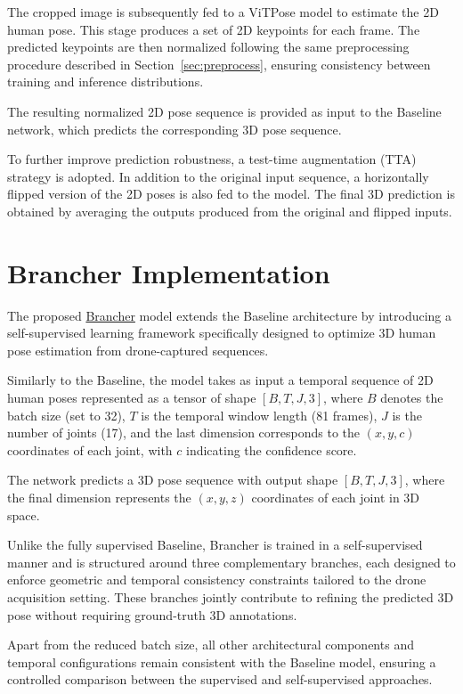 The cropped image is subsequently fed to a ViTPose \cite{xu2022vitpose} model to estimate the 2D human pose. This stage produces a set of 2D keypoints for each frame. The predicted keypoints are then normalized following the same 
preprocessing procedure described in Section~\ref{sec:preprocess}, ensuring consistency between training and inference distributions.

The resulting normalized 2D pose sequence is provided as input to the Baseline network, which predicts the corresponding 3D pose sequence.

To further improve prediction robustness, a test-time augmentation (TTA) strategy is adopted. In addition to the original input sequence, a horizontally flipped version of the 2D poses is also fed to the model. The final 3D prediction 
is obtained by averaging the outputs produced from the original and flipped inputs.


\section{Brancher Implementation}
The proposed \hyperref[sec:brancher]{Brancher} model extends the Baseline architecture by introducing a self-supervised learning framework specifically designed to optimize 3D human pose estimation from drone-captured sequences.

Similarly to the Baseline, the model takes as input a temporal sequence of 2D human poses represented as a tensor of shape $[B, T, J, 3]$, where $B$ denotes the batch size (set to 32), $T$ is the temporal window length (81 frames), 
$J$ is the number of joints (17), and the last dimension corresponds to the $(x, y, c)$ coordinates of each joint, with $c$ indicating the confidence score.

The network predicts a 3D pose sequence with output shape $[B, T, J, 3]$, where the final dimension represents the $(x, y, z)$ coordinates of each joint in 3D space.

Unlike the fully supervised Baseline, Brancher is trained in a self-supervised manner and is structured around three complementary branches, each designed to enforce geometric and temporal consistency constraints tailored to the 
drone acquisition setting. These branches jointly contribute to refining the predicted 3D pose without requiring ground-truth 3D annotations.

Apart from the reduced batch size, all other architectural components and temporal configurations remain consistent with the Baseline model, ensuring a controlled comparison between the supervised and self-supervised approaches.

